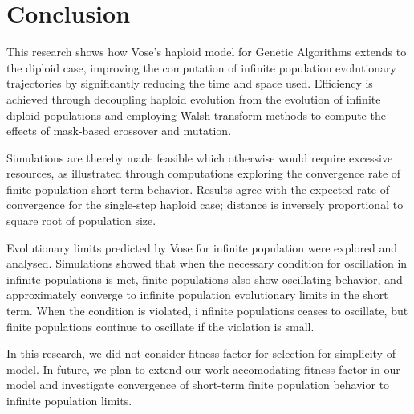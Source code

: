 \chapter{Conclusion}
This research shows how Vose's haploid model for Genetic Algorithms
extends to the diploid case, improving the computation of infinite
population evolutionary trajectories by significantly reducing the
time and space used.  Efficiency is achieved through decoupling
haploid evolution from the evolution of infinite diploid populations
and employing Walsh transform methods to compute the effects of
mask-based crossover and mutation.  

Simulations are thereby made feasible which otherwise would require
excessive resources, as illustrated through computations exploring 
the convergence rate of finite population short-term behavior. Results agree with the
expected rate of convergence for the single-step haploid case;
distance is inversely proportional to square root of population size.

Evolutionary limits predicted by Vose for infinite population were explored and analysed. 
Simulations showed that when the necessary condition for oscillation in infinite populations is met, 
finite populations also show oscillating behavior, and approximately converge to 
infinite population evolutionary limits in the short term. When the condition is violated, i
nfinite populations ceases to oscillate, but finite populations continue to oscillate if the violation is small.

In this research, we did not consider fitness factor for selection for simplicity of model. 
In future, we plan to extend our work accomodating fitness factor in our model and investigate 
convergence of short-term finite population behavior to infinite population limits.


